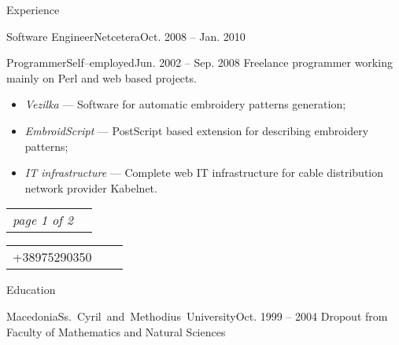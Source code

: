 \documentclass[]{mcdowellcv}
\begin{document}
\begin{cvsection}{Experience}
\begin{cvsubsection}{Software Engineer}{Netcetera}{Oct. 2008 -- Jan. 2010}
\begin{itemize}
            \end{itemize}
        \end{cvsubsection}
        \begin{cvsubsection}{Programmer}{Self--employed}{Jun. 2002 -- Sep. 2008}
            Freelance programmer working mainly on Perl and web based projects.
            \begin{itemize}
                \item \textit{Vezilka} --- Software for automatic embroidery patterns generation;
                \item \textit{EmbroidScript} --- PostScript based extension for describing embroidery patterns;
                \item \textit{IT infrastructure} --- Complete web IT infrastructure for cable distribution network provider Kabelnet.
            \end{itemize}
        \end{cvsubsection}
    \end{cvsection}

    \vfill
    \begin{tabu} to 1\textwidth {X[l,m] X[r,m]}
        \textit{page 1 of 2}
    \end{tabu}
    \clearpage

    \begin{center}
        \begin{tabu} to 1\textwidth {X[l,m] X[c,m] X[r,m]}
            \small{+38975290350} &
            \textbf{\Large{}} &
            \small{} \linebreak
        \end{tabu}
    \end{center}
    \vspace*{20pt}

    \begin{cvsection}{Education}
    \label{Education}
        \begin{cvsubsection}{Macedonia}{\mbox{Ss. Cyril and Methodius University}}{Oct. 1999 -- 2004}
            Dropout from Faculty of Mathematics and Natural Sciences
        \end{cvsubsection}
    \end{cvsection}
\end{document}
